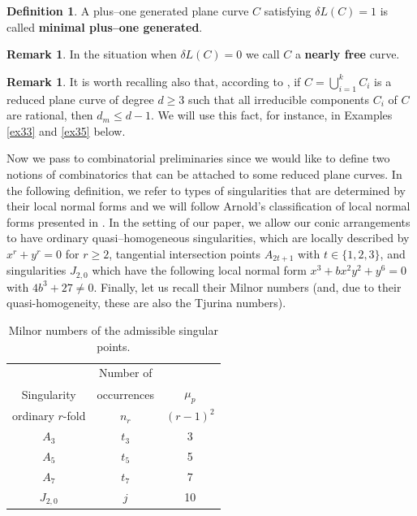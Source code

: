 \documentclass[11pt]{article}
\theoremstyle{plain}
\theoremstyle{definition}
\newtheorem{definition}[thm]{Definition}
\newtheorem{remark}[thm]{Remark}
\begin{document}
\begin{definition}
A plus--one generated plane curve $C$ satisfying $\delta L(C)=1$ is called \textbf{minimal plus--one generated}.
\end{definition}
\begin{remark}
In the situation when $\delta L(C) = 0$ we call $C$ a \textbf{nearly free} curve.
\end{remark}
\begin{remark}
\label{cruci}
It is worth recalling also that,  according to \cite[Corollary 5.2]{DS20}, if $C = \bigcup_{i=1}^{k}C_{i}$ is a reduced plane curve of degree $d\geq 3$ such that all irreducible components $C_{i}$ of $C$ are rational, then $d_{m}\leq d-1$. We will use this fact, for instance, in Examples \ref{ex33} and \ref{ex35} below.
\end{remark}
Now we pass to combinatorial preliminaries since we would like to define two notions of combinatorics that can be attached to some reduced plane curves. In the following definition, we refer to types of singularities that are determined by their local normal forms and we will follow Arnold's classification of local normal forms presented in \cite{arnold}. In the setting of our paper, we allow our conic arrangements to have ordinary quasi--homogeneous singularities, which are locally described by $x^{r} + y^{r}=0$ for $r \geq 2$, tangential intersection points $A_{2t+1}$ with $t \in \{1,2,3\}$, and singularities $J_{2,0}$ which have the following local normal form $x^3 + bx^{2}y^{2}+y^{6} = 0$  with $4b^{3}+27 \neq 0$. Finally, let us recall their Milnor numbers (and, due to their quasi-homogeneity, these are also the Tjurina numbers).
\begin{table}[h!]
    \centering
    \begin{tabular}{c|c|c}
     & Number of &  \\
     Singularity & occurrences & $\mu_{p}$ \\ \hline
    ordinary $r$-fold & $n_r$ & $(r-1)^2$  \\
    $A_{3}$ & $t_3$ & 3  \\
    $A_{5}$ & $t_5$ & 5  \\
    $A_{7}$ & $t_7$ & 7  \\
    $J_{2,0}$ & $j$ & 10
    \end{tabular}
    \caption {Milnor numbers of the admissible singular points.}
    \label{table: ADES}
\end{table}
\end{document}
